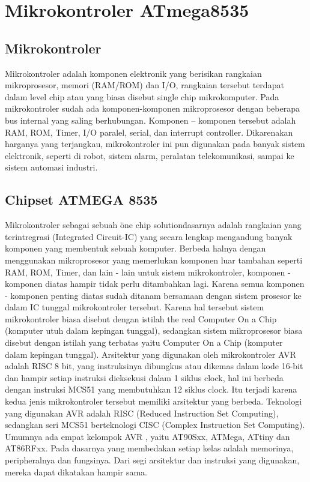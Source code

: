 \section{Mikrokontroler ATmega8535}

	\subsection{Mikrokontroler}
		Mikrokontroler adalah komponen elektronik yang berisikan rangkaian mikroprosesor, memori (RAM/ROM) dan I/O, rangkaian tersebut terdapat dalam level chip atau yang biasa disebut single chip mikrokomputer. Pada mikrokontroler sudah ada komponen-komponen mikroprosesor dengan beberapa bus internal yang saling berhubungan. Komponen – komponen tersebut adalah RAM, ROM, Timer, I/O paralel, serial, dan interrupt controller. Dikarenakan harganya yang terjangkau, mikrokontroler ini pun digunakan pada banyak sistem elektronik, seperti di robot, sistem alarm, peralatan telekomunikasi, sampai ke sistem automasi industri.
		
	\subsection{Chipset ATMEGA 8535}
		Mikrokontroler sebagai sebuah \"one chip solution\" dasarnya adalah rangkaian yang terintregrasi (Integrated Circuit-IC) yang secara lengkap mengandung banyak komponen yang membentuk sebuah komputer. Berbeda halnya dengan menggunakan mikroprosesor yang memerlukan komponen luar tambahan seperti RAM, ROM, Timer, dan lain - lain untuk sistem mikrokontroler, komponen - komponen diatas hampir tidak perlu ditambahkan lagi. Karena semua komponen - komponen penting diatas sudah ditanam bersamaan dengan sistem prosesor ke dalam IC tunggal mikrokontroler tersebut. Karena hal tersebut sistem mikrokontroler biasa disebut dengan istilah the real Computer On a Chip (komputer utuh dalam kepingan tunggal), sedangkan sistem mikroprosesor biasa disebut dengan istilah yang terbatas yaitu Computer On a Chip (komputer dalam kepingan tunggal).
		Arsitektur yang digunakan oleh mikrokontroler AVR adalah RISC 8 bit, yang instruksinya dibungkus atau dikemas dalam kode 16-bit dan hampir setiap instruksi dieksekusi dalam 1 siklus clock, hal ini berbeda dengan instruksi MCS51 yang membutuhkan 12 siklus clock. Itu terjadi karena kedua jenis mikrokontroler tersebut memiliki arsitektur yang berbeda. Teknologi yang digunakan AVR adalah RISC (Reduced Instruction Set Computing), sedangkan seri MCS51 berteknologi CISC (Complex Instruction Set Computing). Umumnya ada empat kelompok AVR , yaitu AT90Sxx, ATMega, ATtiny dan AT86RFxx. Pada dasarnya yang membedakan setiap kelas adalah memorinya, peripheralnya dan fungsinya. Dari segi arsitektur dan instruksi yang digunakan, mereka dapat dikatakan hampir sama.
		
